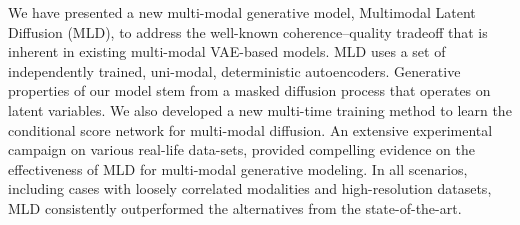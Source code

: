 We have presented a new multi-modal generative model, Multimodal Latent Diffusion (\gls{MLD}), to address the well-known coherence--quality tradeoff that is inherent in existing multi-modal \gls{VAE}-based models. \gls{MLD} uses a set of independently trained, uni-modal, deterministic autoencoders. Generative properties of our model stem from a masked diffusion process that operates on latent variables. We also developed a new multi-time training method to learn the conditional score network for multi-modal diffusion. An extensive experimental campaign on various real-life data-sets, provided compelling evidence on the effectiveness of \gls{MLD} for multi-modal generative modeling. In all scenarios, including cases with loosely correlated modalities and high-resolution datasets, \gls{MLD} consistently outperformed the alternatives from the state-of-the-art. 

